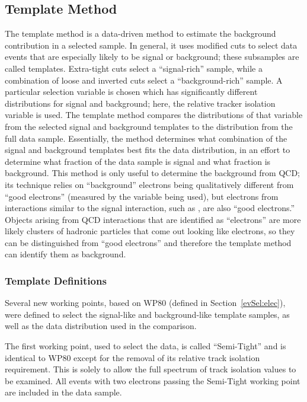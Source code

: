 \subsection{Template Method}
\label{anMeth:BGSubTemplate}
The template method is a data-driven method 
to estimate the background contribution 
in a selected sample.  
In general, it uses modified cuts 
to select data events that are especially 
likely to be signal or background; 
these subsamples are called templates.  
Extra-tight cuts select a ``signal-rich'' sample, 
while a combination of loose and inverted cuts 
select a ``background-rich'' sample.  
A particular selection variable is chosen 
which has significantly different distributions 
for signal and background; 
here, the relative tracker isolation variable is used.  
The template method compares the 
distributions of that variable 
from the selected signal and background templates 
to the distribution from the full data sample. %
Essentially, the method determines what 
combination of the signal and background templates 
best fits the data distribution, 
in an effort to determine what fraction 
of the data sample is signal 
and what fraction is background.  
This method is only useful to determine the 
background from QCD; 
its technique relies on ``background'' electrons 
being qualitatively different from 
``good electrons'' 
(measured by the variable being used), 
but electrons from interactions similar 
to the signal interaction, 
such as \Wenu, 
are also ``good electrons.''  
Objects arising from QCD interactions that are 
identified as ``electrons'' are more likely 
clusters of hadronic particles 
that come out looking like electrons, 
so they can be distinguished from 
``good electrons'' and therefore 
the template method can identify 
them as background.  

\subsubsection{Template Definitions}
\label{anMeth:BGSubTemplateDefs}

Several new working points, based on WP80 
(defined in Section~\ref{evSel:elec}), were defined to select 
the signal-like and background-like template samples, 
as well as the data distribution used in the comparison.  

The first working point, used to select the data, 
is called ``Semi-Tight'' and is identical to WP80 
except for the removal of its relative track isolation 
requirement.  
This is solely to allow the full spectrum of track 
isolation values to be examined.   
All events with two electrons passing the 
Semi-Tight working point are 
included in the data sample.  

